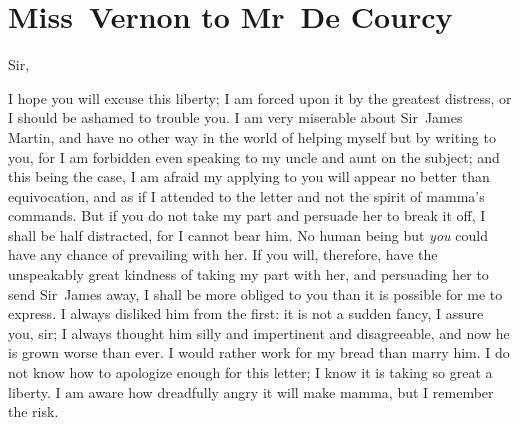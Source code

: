 \chapter{Miss~Vernon to Mr~De Courcy}

  	\begin{letter}
\enlargethispage{\baselineskip}
\end{letter}
	
\begin{mail}{}{Sir,}
	
I hope you will excuse this liberty; I am forced upon it by the greatest distress, or I should be ashamed to trouble you. I am very miserable about Sir~James Martin, and have no other way in the world of helping myself but by writing to you, for I am forbidden even speaking to my uncle and aunt on the subject; and this being the case, I am afraid my applying to you will appear no better than equivocation, and as if I attended to the letter and not the spirit of mamma's commands. But if you do not take my part and persuade her to break it off, I shall be half distracted, for I cannot bear him. No human being but \textit{you} could have any chance of prevailing with her. If you will, therefore, have the unspeakably great kindness of taking my part with her, and persuading her to send Sir~James away, I shall be more obliged to you than it is possible for me to express. I always disliked him from the first: it is not a sudden fancy, I assure you, sir; I always thought him silly and impertinent and disagreeable, and now he is grown worse than ever. I would rather work for my bread than marry him. I do not know how to apologize enough for this letter; I know it is taking so great a liberty. I am aware how dreadfully angry it will make mamma, but I remember the risk. 

\end{mail}